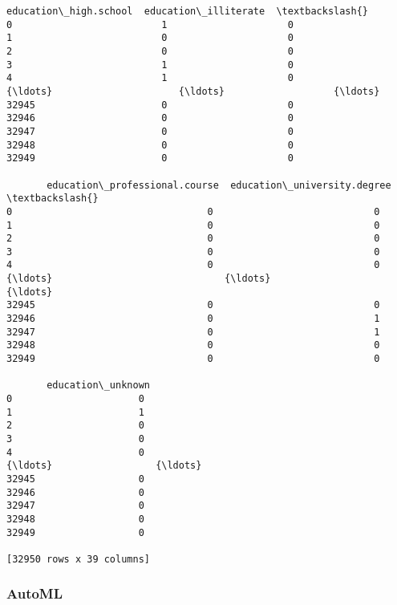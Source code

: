 \documentclass[11pt]{article}
\begin{document}
\begin{tcolorbox}[breakable, size=fbox, boxrule=.5pt, pad at break*=1mm, opacityfill=0]
\begin{Verbatim}[commandchars=\\\{\}]
       education\_high.school  education\_illiterate  \textbackslash{}
0                          1                     0
1                          0                     0
2                          0                     0
3                          1                     0
4                          1                     0
{\ldots}                      {\ldots}                   {\ldots}
32945                      0                     0
32946                      0                     0
32947                      0                     0
32948                      0                     0
32949                      0                     0

       education\_professional.course  education\_university.degree  \textbackslash{}
0                                  0                            0
1                                  0                            0
2                                  0                            0
3                                  0                            0
4                                  0                            0
{\ldots}                              {\ldots}                          {\ldots}
32945                              0                            0
32946                              0                            1
32947                              0                            1
32948                              0                            0
32949                              0                            0

       education\_unknown
0                      0
1                      1
2                      0
3                      0
4                      0
{\ldots}                  {\ldots}
32945                  0
32946                  0
32947                  0
32948                  0
32949                  0

[32950 rows x 39 columns]
\end{Verbatim}
\end{tcolorbox}
        
    \hypertarget{automl}{%
\subsubsection{AutoML}\label{automl}}
\end{document}
